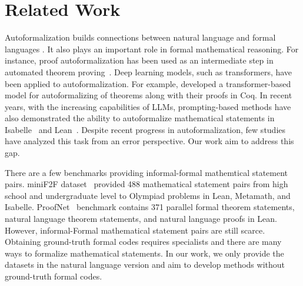 \section{Related Work}
Autoformalization builds connections between natural language and formal languages \cite{quan-etal-2024-verification,quan-etal-2024-enhancing}. It also plays an important role in formal mathematical reasoning. For instance, proof autoformalization has been used as an intermediate step in automated theorem proving~\citep{jiang2023draft,tarrach2024more}. Deep learning models, such as transformers, have been applied to autoformalization. For example, \citet{cunningham-etal-2022-towards} developed a transformer-based model for autoformalizing of theorems along with their proofs in Coq. In recent years, with the increasing capabilities of LLMs, prompting-based methods have also demonstrated the ability to autoformalize mathematical statements in Isabelle~\citep{wu2022autoformalization,zhang-etal-2024-consistent,li2024autoformalize} and Lean~\citep{lu2024processdrivenautoformalizationlean4}. Despite recent progress in autoformalization, few studies have analyzed this task from an error perspective. Our work aim to address this gap.

There are a few benchmarks providing informal-formal mathemtical statement pairs. miniF2F dataset~\citep{zheng2022miniff} provided 488 mathematical statement pairs from high school and undergraduate level to Olympiad problems in Lean, Metamath, and Isabelle. ProofNet~\citep{azerbayev2023proofnet} benchmark contains 371 parallel formal theorem statements, natural language theorem statements, and natural language proofs in Lean. However, informal-Formal mathematical statement pairs are still scarce. Obtaining ground-truth formal codes requires specialists and there are many ways to formalize mathematical statements. In our work, we only provide the datasets in the natural language version and aim to develop methods without ground-truth formal codes.

